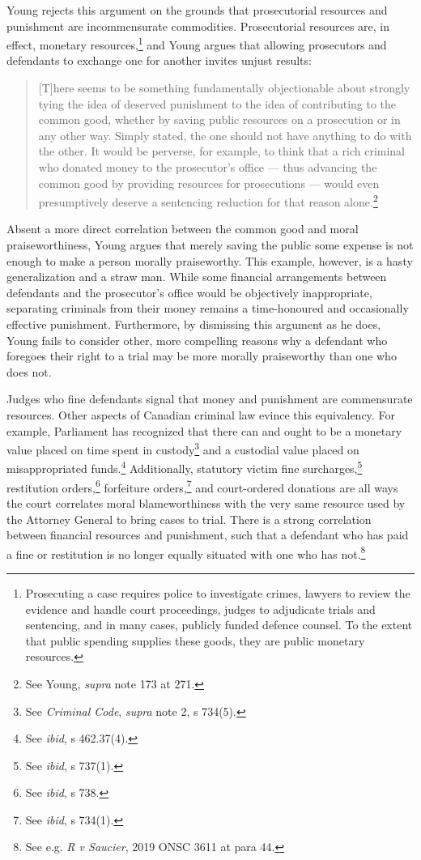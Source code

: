 Young rejects this argument on the grounds that prosecutorial resources and punishment are incommensurate commodities. Prosecutorial resources are, in effect, monetary resources,\footnote{Prosecuting a case requires police to investigate crimes, lawyers to review the evidence and handle court proceedings, judges to adjudicate trials and sentencing, and in many cases, publicly funded defence counsel. To the extent that public spending supplies these goods, they are public monetary resources.} and Young argues that allowing prosecutors and defendants to exchange one for another invites unjust results:

\begin{quote}
    \begin{singlespace}
    
    [T]here seems to be something fundamentally objectionable about strongly tying the idea of deserved punishment to the idea of contributing to the common good, whether by saving public resources on a prosecution or in any other way. Simply stated, the one should not have anything to do with the other. It would be perverse, for example, to think that a rich criminal who donated money to the prosecutor's office — thus advancing the common good by providing resources for prosecutions — would even presumptively deserve a sentencing reduction for that reason alone.\footnote{See Young, \textit{supra} note 173 at 271.}
    \end{singlespace}
\end{quote}
Absent a more direct correlation between the common good and moral praiseworthiness, Young argues that merely saving the public some expense is not enough to make a person morally praiseworthy. This example, however, is a hasty generalization and a straw man. While some financial arrangements between defendants and the prosecutor's office would be objectively inappropriate, separating criminals from their money remains a time-honoured and occasionally effective punishment. Furthermore, by dismissing this argument as he does, Young fails to consider other, more compelling reasons why a defendant who foregoes their right to a trial may be more morally praiseworthy than one who does not.

Judges who fine defendants signal that money and punishment are commensurate resources. Other aspects of Canadian criminal law evince this equivalency. For example, Parliament has recognized that there can and ought to be a monetary value placed on time spent in custody\footnote{See \textit{Criminal Code}, \textit{supra} note 2, s 734(5).} and a custodial value placed on misappropriated funds.\footnote{See \textit{ibid}, s 462.37(4).} Additionally, statutory victim fine surcharges,\footnote{See \textit{ibid}, s 737(1).} restitution orders,\footnote{See \textit{ibid}, s 738.} forfeiture orders,\footnote{See \textit{ibid}, s 734(1).} and court-ordered donations are all ways the court correlates moral blameworthiness with the very same resource used by the Attorney General to bring cases to trial. There is a strong correlation between financial resources and punishment, such that a defendant who has paid a fine or restitution is no longer equally situated with one who has not.\footnote{See e.g. \textit{R v Saucier}, 2019 ONSC 3611 at para 44.}

